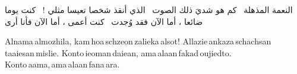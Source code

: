 النعمة المذهلة 
كم هو شديَ ذلك الصوت 
الذي أنقذ شخصا تعيسا مثلي ! 
كنت يوما ضائعا ، أما الآن فقد وُجدت 
كنت أعمى ، أما الآن فأنا أرى

Alnama almozhila,
kam hoa schzeon zalieka alsot!
Allazie ankaza schachsan
taaiesan mislie.
Konto ieoman daiean,
ama alaan fakad oujiedto.
Konto aama, ama alaan fana ara.
